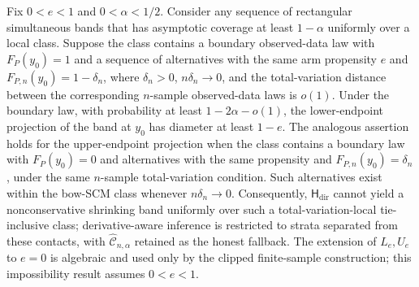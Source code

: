 Fix \(0<e<1\) and \(0<\alpha<1/2\). Consider any sequence of rectangular simultaneous bands that has asymptotic coverage at least \(1-\alpha\) uniformly over a local class. Suppose the class contains a boundary observed-data law with \(F_P(y_0)=1\) and a sequence of alternatives with the same arm propensity \(e\) and \(F_{P,n}(y_0)=1-\delta_n\), where \(\delta_n>0\), \(n\delta_n\to0\), and the total-variation distance between the corresponding \(n\)-sample observed-data laws is \(o(1)\). Under the boundary law, with probability at least \(1-2\alpha-o(1)\), the lower-endpoint projection of the band at \(y_0\) has diameter at least \(1-e\). The analogous assertion holds for the upper-endpoint projection when the class contains a boundary law with \(F_P(y_0)=0\) and alternatives with the same propensity and \(F_{P,n}(y_0)=\delta_n\), under the same \(n\)-sample total-variation condition. Such alternatives exist within the bow-SCM class whenever \(n\delta_n\to0\). Consequently, \(\mathsf H_{\mathrm{dir}}\) cannot yield a nonconservative shrinking band uniformly over such a total-variation-local tie-inclusive class; derivative-aware inference is restricted to strata separated from these contacts, with \(\widehat{\mathcal C}_{n,\alpha}\) retained as the honest fallback. The extension of \(L_e,U_e\) to \(e=0\) is algebraic and used only by the clipped finite-sample construction; this impossibility result assumes \(0<e<1\).